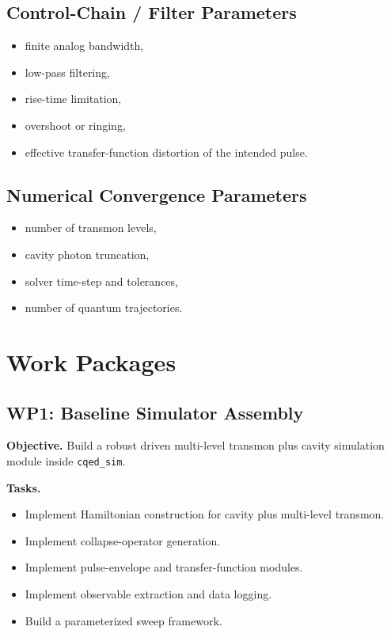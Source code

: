 \documentclass[11pt]{article}
\begin{document}
\subsection{Control-Chain / Filter Parameters}
\begin{itemize}[leftmargin=2em]
    \item finite analog bandwidth,
    \item low-pass filtering,
    \item rise-time limitation,
    \item overshoot or ringing,
    \item effective transfer-function distortion of the intended pulse.
\end{itemize}

\subsection{Numerical Convergence Parameters}
\begin{itemize}[leftmargin=2em]
    \item number of transmon levels,
    \item cavity photon truncation,
    \item solver time-step and tolerances,
    \item number of quantum trajectories.
\end{itemize}

\section{Work Packages}

\subsection{WP1: Baseline Simulator Assembly}

\textbf{Objective.} Build a robust driven multi-level transmon plus cavity simulation module
inside \texttt{cqed\_sim}.

\textbf{Tasks.}
\begin{itemize}[leftmargin=2em]
    \item Implement Hamiltonian construction for cavity plus multi-level transmon.
    \item Implement collapse-operator generation.
    \item Implement pulse-envelope and transfer-function modules.
    \item Implement observable extraction and data logging.
    \item Build a parameterized sweep framework.
\end{itemize}
\end{document}
